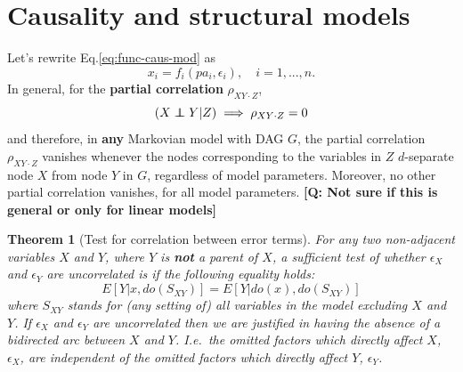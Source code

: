 \documentclass[11pt]{article}
\numberwithin{equation}{section}
\newcommand\indep{\protect\mathpalette{\protect\independenT}{\perp}}
\def\independenT#1#2{\mathrel{\rlap{$#1#2$}\mkern2mu{#1#2}}}
\newtheorem{thm}{Theorem}[section]
\begin{document}
\section{Causality and structural models}

Let's rewrite Eq.\eqref{eq:func-caus-mod} as
\begin{equation}
x_i = f_i(pa_i, \epsilon_i), \quad i=1,...,n. 
\end{equation}
In general, for the \textbf{partial correlation} $\rho_{XY\cdot Z}$, 
\begin{equation}
(X \indep Y | Z) \implies \rho_{XY\cdot Z} = 0 
\end{equation}
and therefore, in \textbf{any} Markovian model with DAG $G$, the partial correlation $\rho_{XY\cdot Z}$ vanishes whenever the nodes corresponding to the variables in $Z$ $d$-separate node $X$ from node $Y$ in $G$, regardless of model parameters. Moreover, no other partial correlation vanishes, for all model parameters. \textbf{[Q: Not sure if this is general or only for linear models]}

\begin{thm}[Test for correlation between error terms]
For any two non-adjacent variables $X$ and $Y$, where $Y$ is \textbf{not} a parent of $X$, a sufficient test of whether $\epsilon_X$ and $\epsilon_Y$ are uncorrelated is if the following equality holds:
\begin{equation}
E[Y|x,do(S_{XY})] = E[Y|do(x),do(S_{XY})] \label{eq:test-corr-error}
\end{equation}
where $S_{XY}$ stands for (any setting of) all variables in the model excluding $X$ and $Y$. If $\epsilon_X$ and $\epsilon_Y$ are uncorrelated then we are justified in having the absence of a bidirected arc between $X$ and $Y$. I.e.\ the omitted factors which directly affect $X$, $\epsilon_X$, are independent of the omitted factors which directly affect $Y$, $\epsilon_Y$.
\end{thm}
\end{document}
